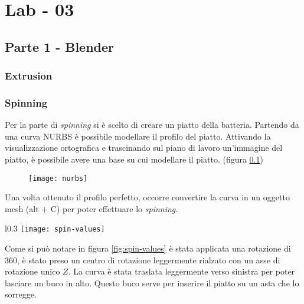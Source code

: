 \chapter*{Lab - 03}

\section{Parte 1 - Blender}

\subsection{Extrusion}


\subsection{Spinning}
Per la parte di \textit{spinning} si è scelto di creare un piatto della batteria. Partendo da una curva NURBS è possibile modellare il profilo del piatto. Attivando la visualizzazione ortografica e trascinando sul piano di lavoro un'immagine del piatto, è possibile avere una base su cui modellare il piatto. (figura \ref{fig:nurbs})

 \begin{figure}[htb]
    \centering
    \texttt{[image: nurbs]}
    \caption{\label{fig:nurbs}}
\end{figure}

Una volta ottenuto il profilo perfetto, occorre convertire la curva in un oggetto mesh (alt + C) per poter effettuare lo \textit{spinning}. 

\begin{wrapfigure}{l}{0.3\textwidth} %
    \centering
    \vspace{-0.7cm}
    \texttt{[image: spin-values]}
    \caption{\label{fig:spin-values}}
    \vspace{-3.7cm}
\end{wrapfigure}

\vspace{1cm}Come si può notare in figura \ref{fig:spin-values} è stata applicata una rotazione di 360\degree, è stato preso un centro di rotazione leggermente rialzato con un asse di rotazione unico $Z$.
La curva è stata traslata leggermente verso sinistra per poter lasciare un buco in alto. Questo buco serve per inserire il piatto su un asta che lo sorregge.\\

